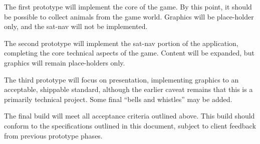 \documentclass[12pt,a4paper,twoside]{article}
\begin{document}
The first prototype will implement the core of the game. By this point, it should be possible to collect animals from the game world. Graphics will be place-holder only, and the sat-nav will not be implemented.

The second prototype will implement the sat-nav portion of the application, completing the core technical aspects of the game. Content will be expanded, but graphics will remain place-holders only.

The third prototype will focus on presentation, implementing graphics to an acceptable, shippable standard, although the earlier caveat remains that this is a primarily technical project. Some final ``bells and whistles'' may be added.

The final build will meet all acceptance criteria outlined above. This build should conform to the specifications outlined in this document, subject to client feedback from previous prototype phases.
\end{document}
